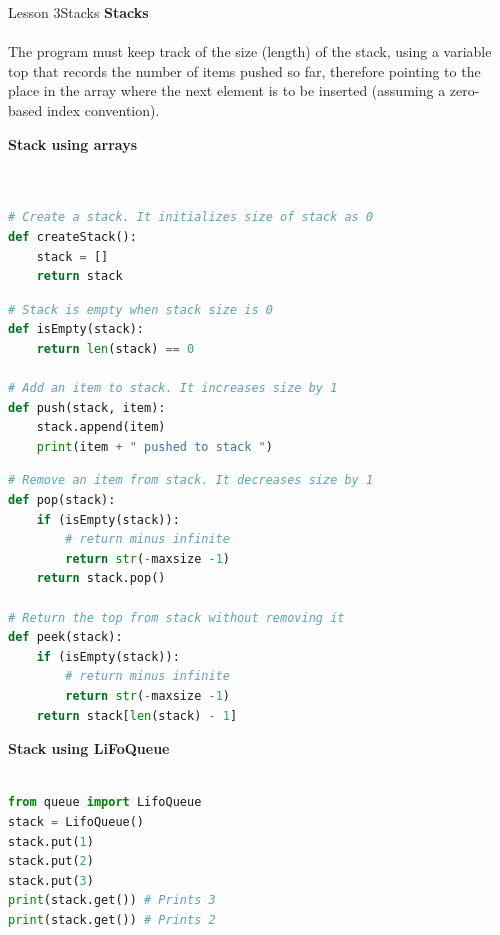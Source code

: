 \documentclass[aspectratio=1610]{beamer}
\begin{document}
\begin{frame}{Lesson 3}{Stacks}
\LARGE
\textbf{Stacks}\\~\\
The program must keep track of the size (length) of the stack, using
a variable top that records the number of items pushed so far,
therefore pointing to the place in the array where the next element
is to be inserted (assuming a zero-based index convention).
\end{frame}


\begin{frame}[fragile]
\Large
\textbf{Stack using arrays}\\~\\
\begin{lstlisting}[language=Python]

# Create a stack. It initializes size of stack as 0 
def createStack(): 
    stack = [] 
    return stack 
\end{lstlisting}
\end{frame}

\begin{frame}[fragile]
\Large
\begin{lstlisting}[language=Python]
# Stack is empty when stack size is 0 
def isEmpty(stack): 
    return len(stack) == 0

# Add an item to stack. It increases size by 1 
def push(stack, item): 
    stack.append(item) 
    print(item + " pushed to stack ")
 \end{lstlisting}
\end{frame} 
    
    
\begin{frame}[fragile]
\Large
\begin{lstlisting}[language=Python]    
# Remove an item from stack. It decreases size by 1 
def pop(stack): 
    if (isEmpty(stack)): 
        # return minus infinite
        return str(-maxsize -1) 
    return stack.pop() 

# Return the top from stack without removing it 
def peek(stack): 
    if (isEmpty(stack)): 
        # return minus infinite
        return str(-maxsize -1)  
    return stack[len(stack) - 1] 
 \end{lstlisting}
\end{frame}


\begin{frame}[fragile]
\LARGE
\textbf{Stack using LiFoQueue}\\~\\
\Large
\begin{lstlisting}[language=Python]
from queue import LifoQueue
stack = LifoQueue()
stack.put(1)
stack.put(2)
stack.put(3)
print(stack.get()) # Prints 3
print(stack.get()) # Prints 2
\end{lstlisting}
\end{frame}
\end{document}
